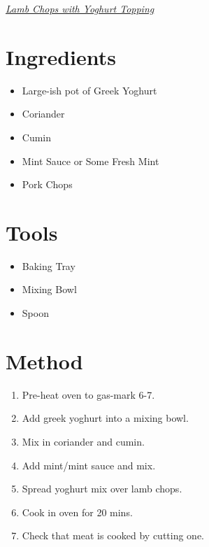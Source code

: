 \documentclass[a4paper,11pt, onecolumn]{article}
\begin{document}
   \centerline{\underline{\emph{\huge Lamb Chops with Yoghurt Topping}}}
   \vspace{1cm}

\begin{multicols}{2}



\section*{Ingredients}

\begin{itemize}
\item Large-ish pot of Greek Yoghurt
\item Coriander
\item Cumin
\item Mint Sauce or Some Fresh Mint
\item Pork Chops
\end{itemize}

\columnbreak

\section*{Tools}
\begin{itemize}
\item Baking Tray
\item Mixing Bowl
\item Spoon
\end{itemize}

\end{multicols}
\hrulefill
\section*{Method}

\begin{enumerate}
\item Pre-heat oven to gas-mark 6-7.
\item Add greek yoghurt into a mixing bowl.
\item Mix in coriander and cumin.
\item Add mint/mint sauce and mix.
\item Spread yoghurt mix over lamb chops.
\item Cook in oven for 20 mins.
\item Check that meat is cooked by cutting one.
\end{enumerate}
 
\end{document}
